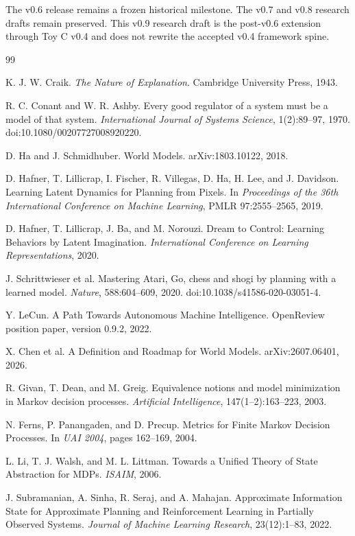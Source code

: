 \documentclass[10pt]{article}
\begin{document}
The v0.6 release remains a frozen historical milestone. The v0.7 and v0.8 research drafts remain preserved. This v0.9 research draft is the post-v0.6 extension through Toy C v0.4 and does not rewrite the accepted v0.4 framework spine.

\begin{thebibliography}{99}

K. J. W. Craik.
\emph{The Nature of Explanation}.
Cambridge University Press, 1943.

R. C. Conant and W. R. Ashby.
Every good regulator of a system must be a model of that system.
\emph{International Journal of Systems Science}, 1(2):89--97, 1970.
doi:10.1080/00207727008920220.

D. Ha and J. Schmidhuber.
World Models.
arXiv:1803.10122, 2018.

D. Hafner, T. Lillicrap, I. Fischer, R. Villegas, D. Ha, H. Lee, and J. Davidson.
Learning Latent Dynamics for Planning from Pixels.
In \emph{Proceedings of the 36th International Conference on Machine Learning}, PMLR 97:2555--2565, 2019.

D. Hafner, T. Lillicrap, J. Ba, and M. Norouzi.
Dream to Control: Learning Behaviors by Latent Imagination.
\emph{International Conference on Learning Representations}, 2020.

J. Schrittwieser et al.
Mastering Atari, Go, chess and shogi by planning with a learned model.
\emph{Nature}, 588:604--609, 2020.
doi:10.1038/s41586-020-03051-4.

Y. LeCun.
A Path Towards Autonomous Machine Intelligence.
OpenReview position paper, version 0.9.2, 2022.

X. Chen et al.
A Definition and Roadmap for World Models.
arXiv:2607.06401, 2026.

R. Givan, T. Dean, and M. Greig.
Equivalence notions and model minimization in Markov decision processes.
\emph{Artificial Intelligence}, 147(1--2):163--223, 2003.

N. Ferns, P. Panangaden, and D. Precup.
Metrics for Finite Markov Decision Processes.
In \emph{UAI 2004}, pages 162--169, 2004.

L. Li, T. J. Walsh, and M. L. Littman.
Towards a Unified Theory of State Abstraction for MDPs.
\emph{ISAIM}, 2006.

J. Subramanian, A. Sinha, R. Seraj, and A. Mahajan.
Approximate Information State for Approximate Planning and Reinforcement Learning in Partially Observed Systems.
\emph{Journal of Machine Learning Research}, 23(12):1--83, 2022.


\end{thebibliography}
\end{document}
